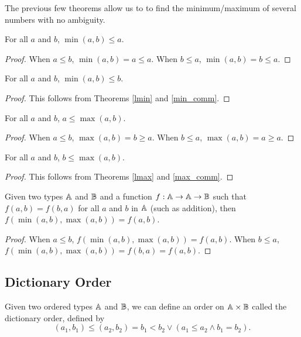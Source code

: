 \documentclass[../math.tex]{subfiles}
\begin{document}
The previous few theorems allow us to to find the minimum/maximum of several
numbers with no ambiguity.

\begin{theorem} \label{lmin}
    For all $a$ and $b$, $\min(a, b) \leq a$.
\end{theorem}
\begin{proof}
    When $a \leq b$, $\min(a, b) = a \leq a$.  When $b \leq a$, $\min(a, b) = b
    \leq a$.
\end{proof}

\begin{theorem} \label{rmin}
    For all $a$ and $b$, $\min(a, b) \leq b$.
\end{theorem}
\begin{proof}
    This follows from Theorems \ref{lmin} and \ref{min_comm}.
\end{proof}

\begin{theorem} \label{lmax}
    For all $a$ and $b$, $a \leq \max(a, b)$.
\end{theorem}
\begin{proof}
    When $a \leq b$, $\max(a, b) = b \geq a$.  When $b \leq a$, $\max(a, b) = a
    \geq a$.
\end{proof}

\begin{theorem} \label{rmax}
    For all $a$ and $b$, $b \leq \max(a, b)$.
\end{theorem}
\begin{proof}
    This follows from Theorems \ref{lmax} and \ref{max_comm}.
\end{proof}

\begin{theorem}
    Given two types $\mathbb{A}$ and $\mathbb{B}$ and a function $f : \mathbb{A} \rightarrow \mathbb{A}
    \rightarrow \mathbb{B}$ such that $f(a, b) = f(b, a)$ for all $a$ and $b$ in $\mathbb{A}$
    (such as addition), then $f(\min(a, b), \max(a, b)) = f(a, b)$.
\end{theorem}
\begin{proof}
    When $a \leq b$, $f(\min(a, b), \max(a, b)) = f(a, b)$.  When $b \leq a$,
    $f(\min(a, b), \max(a, b)) = f(b, a) = f(a, b)$.
\end{proof}

\subsection{Dictionary Order}

\begin{definition}
    Given two ordered types $\mathbb{A}$ and $\mathbb{B}$, we can define an order on $\mathbb{A} \times
    \mathbb{B}$ called the dictionary order, defined by
    \[
        (a_1, b_1) \leq (a_2, b_2) = b_1 < b_2 \vee (a_1 \leq a_2 \wedge b_1 =
        b_2).
    \]
\end{definition}
\end{document}
